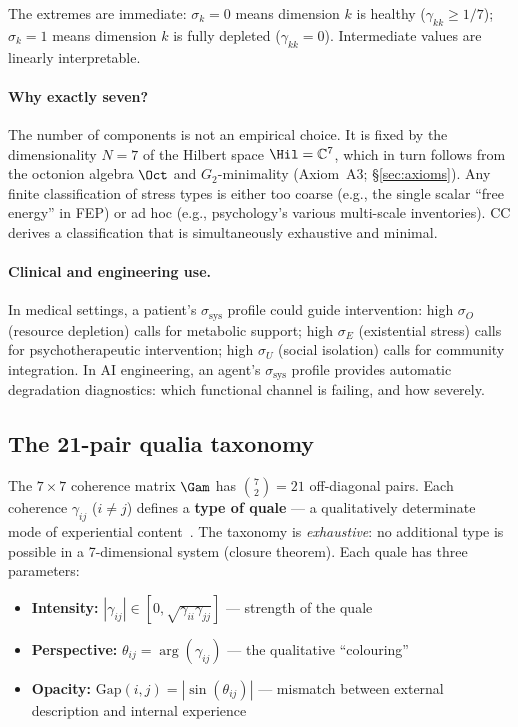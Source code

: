 The extremes are immediate: $\sigma_k = 0$ means dimension $k$ is healthy
($\gamma_{kk} \geq 1/7$); $\sigma_k = 1$ means dimension $k$ is fully depleted
($\gamma_{kk} = 0$).  Intermediate values are linearly interpretable.

\paragraph{Why exactly seven?}
The number of components is not an empirical choice.  It is fixed by the dimensionality
$N = 7$ of the Hilbert space $\Hil = \mathbb{C}^7$, which in turn follows from the
octonion algebra $\Oct$ and $G_2$-minimality (Axiom~A3; \S\ref{sec:axioms}).  Any finite
classification of stress types is either too coarse (e.g., the single scalar ``free energy''
in FEP) or ad hoc (e.g., psychology's various multi-scale inventories).  CC derives a
classification that is simultaneously exhaustive and minimal.

\paragraph{Clinical and engineering use.}
In medical settings, a patient's $\sigma_{\mathrm{sys}}$ profile could guide intervention:
high $\sigma_O$ (resource depletion) calls for metabolic support; high $\sigma_E$
(existential stress) calls for psychotherapeutic intervention; high $\sigma_U$
(social isolation) calls for community integration.  In AI engineering, an agent's
$\sigma_{\mathrm{sys}}$ profile provides automatic degradation diagnostics: which
functional channel is failing, and how severely.

\subsection{The 21-pair qualia taxonomy}
\label{subsec:qualia}

The $7 \times 7$ coherence matrix $\Gam$ has $\binom{7}{2} = 21$ off-diagonal pairs.
Each coherence $\gamma_{ij}$ ($i \neq j$) defines a \textbf{type of quale} ---
a qualitatively determinate mode of experiential content~. The taxonomy is
\emph{exhaustive}: no additional type is possible in a 7-dimensional system (closure
theorem). Each quale has three parameters:

\begin{itemize}[leftmargin=2em]
  \item \textbf{Intensity:} $|\gamma_{ij}| \in [0, \sqrt{\gamma_{ii}\gamma_{jj}}]$ ---
        strength of the quale
  \item \textbf{Perspective:} $\theta_{ij} = \arg(\gamma_{ij})$ --- the qualitative
        ``colouring''
  \item \textbf{Opacity:} $\mathrm{Gap}(i,j) = |\sin(\theta_{ij})|$ --- mismatch between
        external description and internal experience
\end{itemize}

